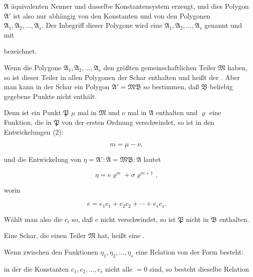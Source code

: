
$\mathfrak{A}$ äquivalenten Nenner und dasselbe Konstantensystem erzeugt,
und dies Polygon $\mathfrak{A}'$ ist also nur abhängig von den Konstanten
und von den Polygonen $\mathfrak{A}_1, \mathfrak{A}_2, \ldots, \mathfrak{A}_s$. Der Inbegriff dieser
Polygone wird eine  $\mathfrak{A}_1, \mathfrak{A}_2, \ldots, \mathfrak{A}_s$
genannt und mit


bezeichnet.

Wenn die Polygone $\mathfrak{A}_1, \mathfrak{A}_2, \ldots, \mathfrak{A}_s$ den größten gemeinschaftlichen
 Teiler $\mathfrak{M}$ haben, so ist dieser Teiler in allen Polygonen
der Schar enthalten und heißt der . Aber
man kann in der Schar ein Polygon $\mathfrak{A}' = \mathfrak{M}\mathfrak{B}$ so bestimmen,
daß $\mathfrak{B}$ beliebig gegebene Punkte nicht enthält.

Denn ist ein Punkt $\mathfrak{P}$ $\mu$ mal in $\mathfrak{M}$ und $\nu$ mal in $\mathfrak{A}$ enthalten
und $\varrho$ eine Funktion, die in $\mathfrak{P}$ von der ersten Ordnung verschwindet,
so ist in den Entwickelungen (2):

\[
m = \mu - \nu,
\]

und die Entwickelung von $\eta = \mathfrak{A}' : \mathfrak{A} = \mathfrak{M}\mathfrak{B} : \mathfrak{A}$ lautet

\[
\eta = e\varrho^m + \sigma\varrho^{m+1},
\]

worin

\[
e = e_1c_1 + e_2c_2 + \cdots + e_sc_s.
\]

Wählt man also die $c_i$ so, daß $e$ nicht verschwindet, so ist
$\mathfrak{P}$ nicht in $\mathfrak{B}$ enthalten.

Eine Schar, die einen Teiler $\mathfrak{M}$ hat, heißt eine .

Wenn zwischen den Funktionen $\eta_1, \eta_2, \ldots, \eta_s$ eine Relation
von der Form besteht:


in der die Konstanten $c_1, c_2, \ldots, c_s$ nicht alle $= 0$ sind, so besteht
 dieselbe Relation


